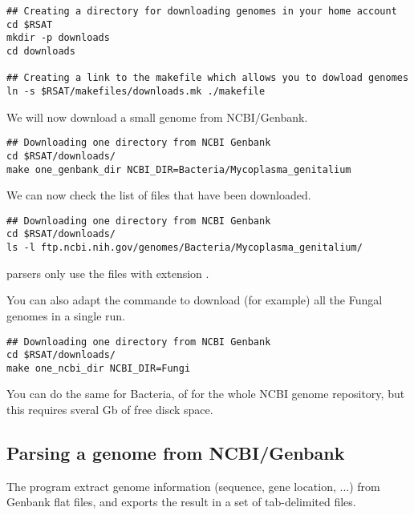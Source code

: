 \begin{footnotesize}
\begin{verbatim}
## Creating a directory for downloading genomes in your home account
cd $RSAT
mkdir -p downloads
cd downloads

## Creating a link to the makefile which allows you to dowload genomes
ln -s $RSAT/makefiles/downloads.mk ./makefile
\end{verbatim}
\end{footnotesize}

We will now download a small genome from NCBI/Genbank. 

\begin{footnotesize}
\begin{verbatim}
## Downloading one directory from NCBI Genbank
cd $RSAT/downloads/
make one_genbank_dir NCBI_DIR=Bacteria/Mycoplasma_genitalium
\end{verbatim}
\end{footnotesize}

We can now check the list of files that have been downloaded.

\begin{footnotesize}
\begin{verbatim}
## Downloading one directory from NCBI Genbank
cd $RSAT/downloads/
ls -l ftp.ncbi.nih.gov/genomes/Bacteria/Mycoplasma_genitalium/
\end{verbatim}
\end{footnotesize}

\RSAT parsers only use the files with extension .

You can also adapt the commande to download (for example) all the
Fungal genomes in a single run.

\begin{footnotesize}
\begin{verbatim}
## Downloading one directory from NCBI Genbank
cd $RSAT/downloads/
make one_ncbi_dir NCBI_DIR=Fungi
\end{verbatim}
\end{footnotesize}

You can do the same for Bacteria, of for the whole NCBI genome
repository, but this requires sveral Gb of free disck space.

\subsection{Parsing a genome from NCBI/Genbank}

The program  extract genome information
(sequence, gene location, ...) from Genbank flat files, and exports
the result in a set of tab-delimited files.

